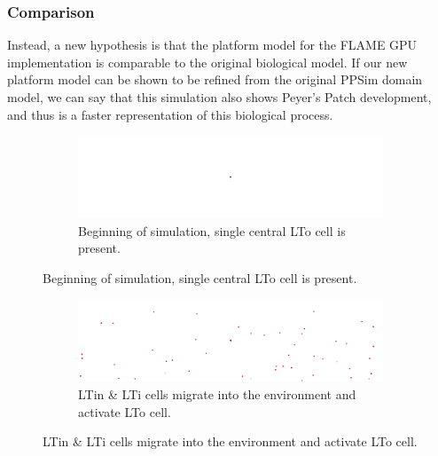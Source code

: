 \documentclass{UoYCSproject}
\begin{document}
\subsubsection{Comparison}
Instead, a new hypothesis is that the platform model for the \gls{FLAME GPU} implementation is comparable to the original biological model.
If our new platform model can be shown to be refined from the original PPSim domain model, we can say that this simulation also shows Peyer's Patch development, and thus is a faster representation of this biological process.

\begin{figure}[htpb]
\begin{subfigure}{\textwidth}
\centering
\includegraphics[width=\textwidth]{Appendix/Sim/Start}
\caption{Beginning of simulation, single central \gls{LTo} cell is present.}
\label{fig:sim_start}
\end{subfigure}
\end{figure}

\begin{figure}[htp]\ContinuedFloat
\begin{subfigure}{\textwidth}
\centering
\includegraphics[width=\textwidth]{Appendix/Sim/Migration}
\caption{\gls{LTin} \& \gls{LTi} cells migrate into the environment and activate \gls{LTo} cell.}
\label{fig:sim_contact}
\end{subfigure}
\end{figure}
\end{document}
